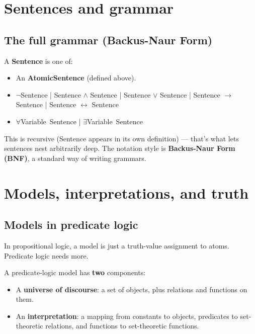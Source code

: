 \documentclass[11pt, a4paper]{article}
\begin{document}
\section{Sentences and grammar}

\subsection{The full grammar (Backus-Naur Form)}

\begin{defbox}
A \textbf{Sentence} is one of:
\begin{itemize}[itemsep=0pt, topsep=0pt]
  \item An \textbf{AtomicSentence} (defined above).
  \item $\neg$Sentence \quad | \quad Sentence $\land$ Sentence \quad | \quad Sentence $\lor$ Sentence \quad | \quad Sentence $\rightarrow$ Sentence \quad | \quad Sentence $\leftrightarrow$ Sentence
  \item $\forall$Variable \,Sentence \quad | \quad $\exists$Variable \,Sentence
\end{itemize}
\end{defbox}

This is recursive (Sentence appears in its own definition) — that's what lets sentences nest arbitrarily deep. The notation style is \textbf{Backus-Naur Form (BNF)}, a standard way of writing grammars.

\section{Models, interpretations, and truth}

\subsection{Models in predicate logic}

In propositional logic, a model is just a truth-value assignment to atoms. Predicate logic needs more.

\begin{defbox}
A predicate-logic model has \textbf{two} components:
\begin{itemize}[itemsep=0pt, topsep=0pt]
  \item A \textbf{universe of discourse}: a set of objects, plus relations and functions on them.
  \item An \textbf{interpretation}: a mapping from constants to objects, predicates to set-theoretic relations, and functions to set-theoretic functions.
\end{itemize}
\end{defbox}
\end{document}

